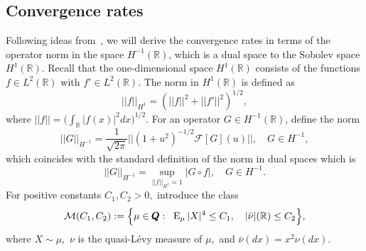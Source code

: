 \documentclass[numbers,webpdf,imaiai]{ima-authoring-template}%
\theoremstyle{thmstyletwo}%
\newcommand{\R}{\mathbb{R}}
\newcommand{\F}{\mathcal{F}}
\newcommand{\E}{\mathrm{E}}
\newcommand{\Q}{\pmb{Q}}
\numberwithin{equation}{section}
\begin{document}
\subsection{Convergence rates}
Following ideas from~\cite{BR2015}, we will 
derive the convergence rates in terms of the operator norm in the space $H^{-1}(\R)$, which is a dual space to the Sobolev space $H^1(\R)$. Recall that the one-dimensional space $H^1(\R)$ consists of the functions $f \in L^2(\R)$ with $f' \in L^2(\R)$. The norm in  $H^1(\R)$  is defined as
\begin{equation*}
    ||f||_{H^1} = %
    (||f||^2 + ||f'||^2)^{1/2},
\end{equation*}
where \(||f||=\bigl(\int_{\R} |f(x)|^2 dx\bigr)^{1/2}\). 
For an operator $G \in H^{-1}(\R)$, define the norm \begin{equation}\label{first_norm}
    ||G||_{H^{-1}} = \frac{1}{\sqrt{2\pi}}||(1 + u^2)^{-1/2}\F[G](u)||, \quad G \in H^{-1},
\end{equation}
which coincides with the standard definition of the norm in dual spaces which is
\begin{equation}\label{second_norm}
    ||G||_{H^{-1}} = \sup_{||f||_{H^1} = 1} |G \circ f|, \quad G \in H^{-1}.
\end{equation}
For positive constants \(C_1, C_2>0,\) introduce the class 
\begin{equation}\label{class_M}
    \mathcal{M}(C_1, C_2) := \Bigl\{ \mu \in \Q : \;\; \E_{\mu}\, |X|^4 \leq C_1, \quad |\bar{\nu}|(\R) \leq C_2 \Bigr\},
\end{equation}
where \(X \sim \mu,\) \(\nu\) is the quasi-L\'evy measure of \(\mu,\) and \(\bar{\nu}(dx) = x^2 \nu(dx)\).
\end{document}
